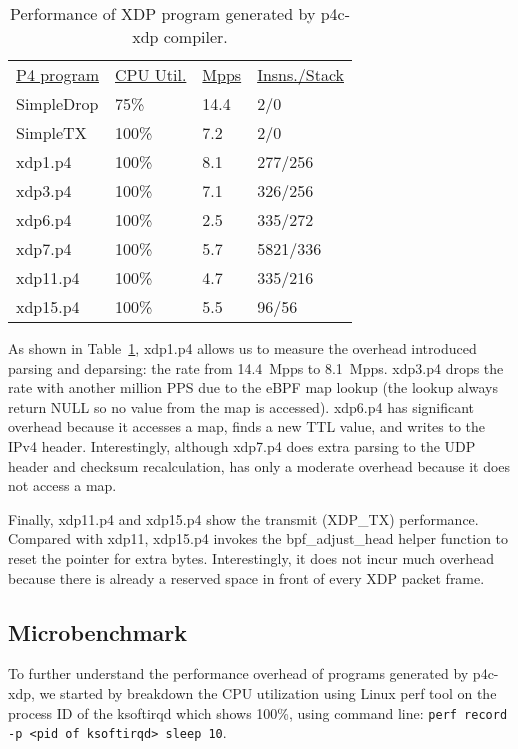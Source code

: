 \begin{table}
\centering
\small
\begin{tabular}{llll}
  \underline{P4 program} & \underline{CPU Util.} & \underline{Mpps} & \underline{Insns./Stack}\\
  SimpleDrop & 75\% & 14.4 & 2/0 \\
  SimpleTX & 100\% & 7.2 & 2/0 \\
  xdp1.p4 &  100\% &  8.1 & 277/256 \\
  xdp3.p4 &  100\% &  7.1 & 326/256 \\
  xdp6.p4 &  100\% &  2.5 & 335/272 \\
  xdp7.p4 &  100\% &  5.7 & 5821/336 \\
  xdp11.p4 &  100\% &  4.7  & 335/216 \\
  xdp15.p4 &  100\% &  5.5 & 96/56\\
\end{tabular}
\caption{\footnotesize Performance of XDP program generated by
  p4c-xdp compiler.}
\label{tab:perf}
\end{table}

As shown in Table~\ref{tab:perf}, xdp1.p4 allows us to measure the
overhead introduced parsing and deparsing: the rate from 14.4~Mpps to
8.1~Mpps.  xdp3.p4 drops the rate with another million PPS due to the
eBPF map lookup (the lookup always return NULL so no value from the
map is accessed).  xdp6.p4 has significant overhead because it
accesses a map, finds a new TTL value, and writes to the IPv4 header.
Interestingly, although xdp7.p4 does extra parsing to the UDP header
and checksum recalculation, has only a moderate overhead because it
does not access a map.

Finally, xdp11.p4 and xdp15.p4 show the transmit (XDP\_TX)
performance.  Compared with xdp11, xdp15.p4 invokes the
bpf\_adjust\_head helper function to reset the pointer for extra
bytes.  Interestingly, it does not incur much overhead because there
is already a reserved space in front of every XDP packet frame.

\subsection{Microbenchmark}

To further understand the performance overhead of programs generated
by p4c-xdp, we started by breakdown the CPU utilization using Linux
perf tool on the process ID of the ksoftirqd which shows 100\%, using
command line: \texttt{perf record -p <pid of ksoftirqd> sleep 10}.

